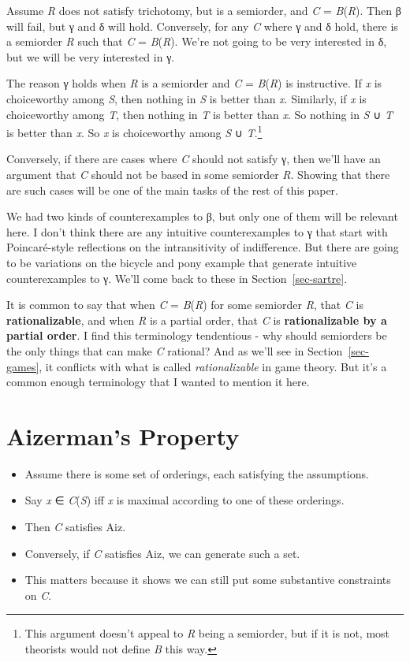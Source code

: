 \documentclass[
  11pt,
  letterpaper,
  DIV=11,
  numbers=noendperiod,
  twoside]{scrartcl}
\providecommand{\tightlist}{%
  \setlength{\itemsep}{0pt}\setlength{\parskip}{0pt}}
\begin{document}
Assume \emph{R} does not satisfy trichotomy, but is a semiorder, and
\emph{C} = \emph{B}(\emph{R}). Then β will fail, but γ and δ will hold.
Conversely, for any \emph{C} where γ and δ hold, there is a semiorder
\emph{R} such that \emph{C} = \emph{B}(\emph{R}). We're not going to be
very interested in δ, but we will be very interested in γ.

The reason γ holds when \emph{R} is a semiorder and \emph{C} =
\emph{B}(\emph{R}) is instructive. If \emph{x} is choiceworthy among
\emph{S}, then nothing in \emph{S} is better than \emph{x}. Similarly,
if \emph{x} is choiceworthy among \emph{T}, then nothing in \emph{T} is
better than \emph{x}. So nothing in \emph{S} ∪ \emph{T} is better than
\emph{x}. So \emph{x} is choiceworthy among \emph{S} ∪
\emph{T}.\footnote{This argument doesn't appeal to \emph{R} being a
  semiorder, but if it is not, most theorists would not define \emph{B}
  this way.}

Conversely, if there are cases where \emph{C} should not satisfy γ, then
we'll have an argument that \emph{C} should not be based in some
semiorder \emph{R}. Showing that there are such cases will be one of the
main tasks of the rest of this paper.

We had two kinds of counterexamples to β, but only one of them will be
relevant here. I don't think there are any intuitive counterexamples to
γ that start with Poincaré-style reflections on the intransitivity of
indifference. But there are going to be variations on the bicycle and
pony example that generate intuitive counterexamples to γ. We'll come
back to these in Section~\ref{sec-sartre}.

It is common to say that when \emph{C} = \emph{B}(\emph{R}) for some
semiorder \emph{R}, that \emph{C} is \textbf{rationalizable}, and when
\emph{R} is a partial order, that \emph{C} is \textbf{rationalizable by
a partial order}. I find this terminology tendentious - why should
semiorders be the only things that can make \emph{C} rational? And as
we'll see in Section~\ref{sec-games}, it conflicts with what is called
\emph{rationalizable} in game theory. But it's a common enough
terminology that I wanted to mention it here.

\section{Aizerman's Property}\label{sec-aiz}

\begin{itemize}
\tightlist
\item
  Assume there is some set of orderings, each satisfying the
  assumptions.
\item
  Say \emph{x} ∈ \emph{C}(\emph{S}) iff \emph{x} is maximal according to
  one of these orderings.
\item
  Then \emph{C} satisfies Aiz.
\item
  Conversely, if \emph{C} satisfies Aiz, we can generate such a set.
\item
  This matters because it shows we can still put some substantive
  constraints on \emph{C}.
\end{itemize}
\end{document}
